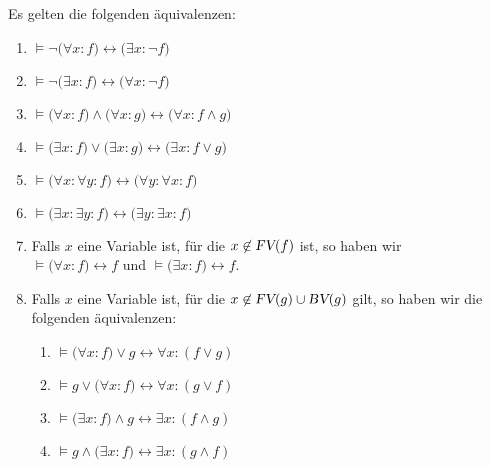 \begin{Satz}
  Es gelten die folgenden \"{a}quivalenzen:
  \begin{enumerate}
  \item $\models \neg\big(\forall x\colon f\big) \leftrightarrow \big(\exists x\colon \neg f\big)$
  \item $\models \neg\big(\exists x\colon f\big) \leftrightarrow \big(\forall x\colon \neg f\big)$
  \item $\models \big(\forall x\colon f\big) \wedge \big(\forall x\colon g\big) \leftrightarrow \big(\forall x\colon f \wedge g\big)$
  \item $\models \big(\exists x\colon f\big) \vee \big(\exists x\colon g\big) \leftrightarrow \big(\exists x\colon f \vee g\big)$
  \item $\models \big(\forall x\colon \forall y\colon f \big) \leftrightarrow \big(\forall y\colon  \forall x\colon f \big)$
  \item $\models \big(\exists x\colon \exists y\colon f \big) \leftrightarrow \big(\exists y\colon  \exists x\colon f \big)$
  \item Falls $x$ eine Variable ist, f\"{u}r die $x \not\in \textsl{FV}(f)$ ist, so haben wir \\[0.2cm]
        \hspace*{1.3cm} $\models  \big(\forall x\colon f) \leftrightarrow f$ \quad und \quad
                        $\models  \big(\exists x\colon f) \leftrightarrow f$.
  \item Falls $x$ eine Variable ist, f\"{u}r die  $x \not\in \textsl{FV}(g) \cup \textsl{BV}(g)$ gilt, so haben wir die folgenden \"{a}quivalenzen:
    \begin{enumerate}
    \item $\models \big(\forall x\colon f) \vee g \leftrightarrow \forall x\colon (f \vee g)$
    \item $\models g \vee \big(\forall x\colon f) \leftrightarrow \forall x\colon (g \vee f)$
    \item $\models \big(\exists x\colon f) \wedge g \leftrightarrow \exists x\colon (f \wedge g)$
    \item $\models g \wedge \big(\exists x\colon f) \leftrightarrow \exists x\colon (g \wedge f)$
    \end{enumerate}
  \end{enumerate}
\end{Satz}

